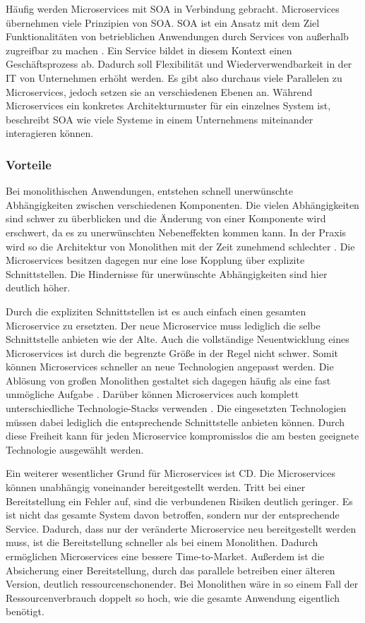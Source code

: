Häufig werden Microservices mit \ac{SOA} in Verbindung gebracht. Microservices übernehmen viele Prinzipien von \ac{SOA}. \ac{SOA} ist ein Ansatz mit dem Ziel Funktionalitäten von betrieblichen Anwendungen durch Services von außerhalb zugreifbar zu machen \parencite[vgl.][S. 2]{wolffMicroservices2018}. Ein Service bildet in diesem Kontext einen Geschäftsprozess ab. Dadurch soll Flexibilität und Wiederverwendbarkeit in der IT von Unternehmen erhöht werden. Es gibt also durchaus viele Parallelen zu Microservices, jedoch setzen sie an verschiedenen Ebenen an. Während Microservices ein konkretes Architekturmuster für ein einzelnes System ist, beschreibt \ac{SOA} wie viele Systeme in einem Unternehmens miteinander interagieren können.

\subsubsection{Vorteile}

Bei monolithischen Anwendungen, entstehen schnell unerwünschte Abhängigkeiten zwischen verschiedenen Komponenten. Die vielen Abhängigkeiten sind schwer zu überblicken und die Änderung von einer Komponente wird erschwert, da es zu unerwünschten Nebeneffekten kommen kann. In der Praxis wird so die Architektur von Monolithen mit der Zeit zunehmend schlechter \parencite[vgl.][S. 3]{wolffMicroservices2018}. Die Microservices besitzen dagegen nur eine lose Kopplung über explizite Schnittstellen. Die Hindernisse für unerwünschte Abhängigkeiten sind hier deutlich höher.

Durch die expliziten Schnittstellen ist es auch einfach einen gesamten Microservice zu ersetzten. Der neue Microservice muss lediglich die selbe Schnittstelle anbieten wie der Alte. Auch die vollständige Neuentwicklung eines Microservices ist durch die begrenzte Größe in der Regel nicht schwer. Somit können Microservices schneller an neue Technologien angepasst werden. Die Ablösung von großen Monolithen gestaltet sich dagegen häufig als eine fast unmögliche Aufgabe \parencite[vgl.][S. 29]{newmanMicroservices2015}. Darüber können Microservices auch komplett unterschiedliche Technologie-Stacks verwenden \parencite[vgl.][S. 5]{wolffMicroservices2018}. Die eingesetzten Technologien müssen dabei lediglich die entsprechende Schnittstelle anbieten können. Durch diese Freiheit kann für jeden Microservice kompromisslos die am besten geeignete Technologie ausgewählt werden.

Ein weiterer wesentlicher Grund für Microservices ist \ac{CD}. Die Microservices können unabhängig voneinander bereitgestellt werden. Tritt bei einer Bereitstellung ein Fehler auf, sind die verbundenen Risiken deutlich geringer. Es ist nicht das gesamte System davon betroffen, sondern nur der entsprechende Service. Dadurch, dass nur der veränderte Microservice neu bereitgestellt werden muss, ist die Bereitstellung schneller als bei einem Monolithen. Dadurch ermöglichen Microservices eine bessere Time-to-Market. Außerdem ist die Absicherung einer Bereitstellung, durch das parallele betreiben einer älteren Version, deutlich ressourcenschonender. Bei Monolithen wäre in so einem Fall der Ressourcenverbrauch doppelt so hoch, wie die gesamte Anwendung eigentlich benötigt.

